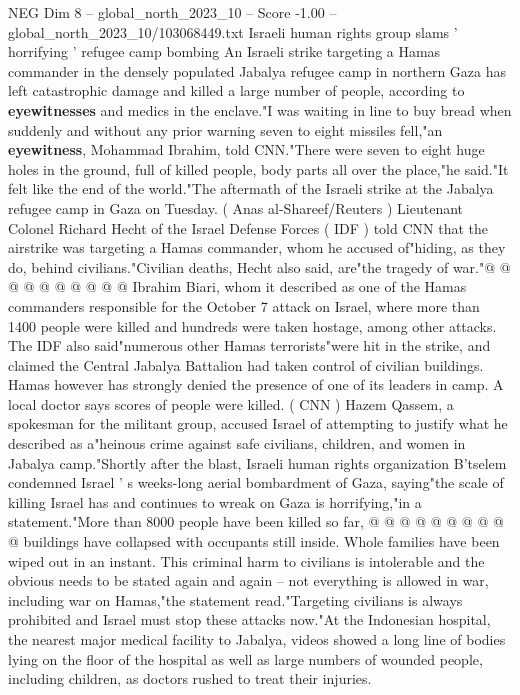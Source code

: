\begin{textsample}{NEG Dim 8 – global\_north\_2023\_10 – Score -1.00 – global\_north\_2023\_10/103068449.txt}  \label{ex:f8_neg_219}
Israeli human rights group slams ' horrifying ' refugee camp bombing An Israeli strike targeting a Hamas commander in the densely populated Jabalya refugee camp in northern Gaza has left catastrophic damage and killed a large number of people, according to \textbf{eyewitnesses} and medics in the enclave."I was waiting in line to buy bread when suddenly and without any prior warning seven to eight missiles fell,"an \textbf{eyewitness}, Mohammad Ibrahim, told CNN."There were seven to eight huge holes in the ground, full of killed people, body parts all over the place,"he said."It felt like the end of the world."The aftermath of the Israeli strike at the Jabalya refugee camp in Gaza on Tuesday. ( Anas al-Shareef/Reuters ) Lieutenant Colonel Richard Hecht of the Israel Defense Forces ( IDF ) told CNN that the airstrike was targeting a Hamas commander, whom he accused of"hiding, as they do, behind civilians."Civilian deaths, Hecht also said, are"the tragedy of war."@ @ @ @ @ @ @ @ @ @ Ibrahim Biari, whom it described as one of the Hamas commanders responsible for the October 7 attack on Israel, where more than 1400 people were killed and hundreds were taken hostage, among other attacks.
The IDF also said"numerous other Hamas terrorists"were hit in the strike, and claimed the Central Jabalya Battalion had taken control of civilian buildings.
Hamas however has strongly denied the presence of one of its leaders in camp.
A local doctor says scores of people were killed. ( CNN ) Hazem Qassem, a spokesman for the militant group, accused Israel of attempting to justify what he described as a"heinous crime against safe civilians, children, and women in Jabalya camp."Shortly after the blast, Israeli human rights organization B'tselem condemned Israel ' s weeks-long aerial bombardment of Gaza, saying"the scale of killing Israel has and continues to wreak on Gaza is horrifying,"in a statement."More than 8000 people have been killed so far, @ @ @ @ @ @ @ @ @ @ buildings have collapsed with occupants still inside.
Whole families have been wiped out in an instant.
This criminal harm to civilians is intolerable and the obvious needs to be stated again and again -- not everything is allowed in war, including war on Hamas,"the statement read."Targeting civilians is always prohibited and Israel must stop these attacks now."At the Indonesian hospital, the nearest major medical facility to Jabalya, videos showed a long line of bodies lying on the floor of the hospital as well as large numbers of wounded people, including children, as doctors rushed to treat their injuries.

\end{textsample}

